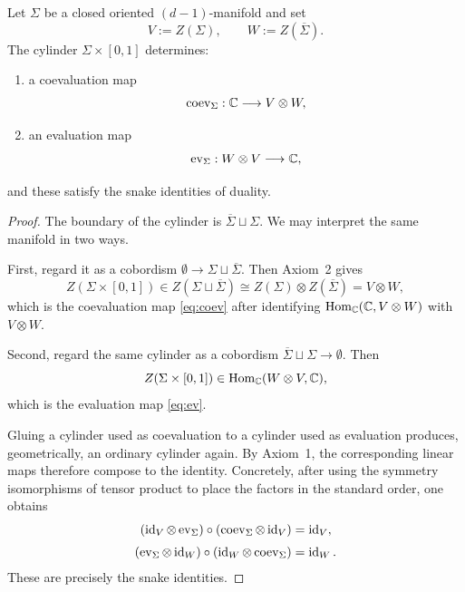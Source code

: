 \begin{proposition}\label{prop:evaluation-coevaluation}
Let $\Sigma$ be a closed oriented $(d-1)$-manifold and set
\begin{equation*}
V := Z(\Sigma),
\qquad
W := Z(\overline{\Sigma}).
\end{equation*}
The cylinder $\Sigma \times [0,1]$ determines:
\begin{enumerate}
\item a coevaluation map
\begin{equation}\label{eq:coev}
\operatorname{coev}_{\Sigma} : \mathbb{C} \longrightarrow V \otimes W,
\end{equation}
\item an evaluation map
\begin{equation}\label{eq:ev}
\operatorname{ev}_{\Sigma} : W \otimes V \longrightarrow \mathbb{C},
\end{equation}
\end{enumerate}
and these satisfy the snake identities of duality.
\end{proposition}

\begin{proof}
The boundary of the cylinder is $\overline{\Sigma} \sqcup \Sigma$. We may interpret the same manifold in two ways.

\medskip

\noindent First, regard it as a cobordism $\emptyset \to \Sigma \sqcup \overline{\Sigma}$. Then Axiom~2 gives
\begin{equation*}
Z(\Sigma \times [0,1]) \in Z(\Sigma \sqcup \overline{\Sigma})
\cong
Z(\Sigma)\otimes Z(\overline{\Sigma})

=
V \otimes W,
\end{equation*}
which is the coevaluation map \eqref{eq:coev} after identifying $\operatorname{Hom}_{\mathbb{C}}(\mathbb{C}, V\otimes W)$ with $V\otimes W$.

\medskip

\noindent Second, regard the same cylinder as a cobordism $\overline{\Sigma} \sqcup \Sigma \to \emptyset$. Then
\begin{equation*}
Z(\Sigma \times [0,1]) \in \operatorname{Hom}_{\mathbb{C}}(W \otimes V, \mathbb{C}),
\end{equation*}
which is the evaluation map \eqref{eq:ev}.

\medskip

\noindent Gluing a cylinder used as coevaluation to a cylinder used as evaluation produces, geometrically, an ordinary cylinder again. By Axiom~1, the corresponding linear maps therefore compose to the identity. Concretely, after using the symmetry isomorphisms of tensor product to place the factors in the standard order, one obtains
\begin{align}
(\operatorname{id}_V \otimes \operatorname{ev}_{\Sigma}) \circ (\operatorname{coev}_{\Sigma} \otimes \operatorname{id}_V) &= \operatorname{id}_V, \label{eq:snake-V} \\[1mm]
(\operatorname{ev}_{\Sigma} \otimes \operatorname{id}_W) \circ (\operatorname{id}_W \otimes \operatorname{coev}_{\Sigma}) &= \operatorname{id}_W. \label{eq:snake-W}
\end{align}
These are precisely the snake identities.
\end{proof}

